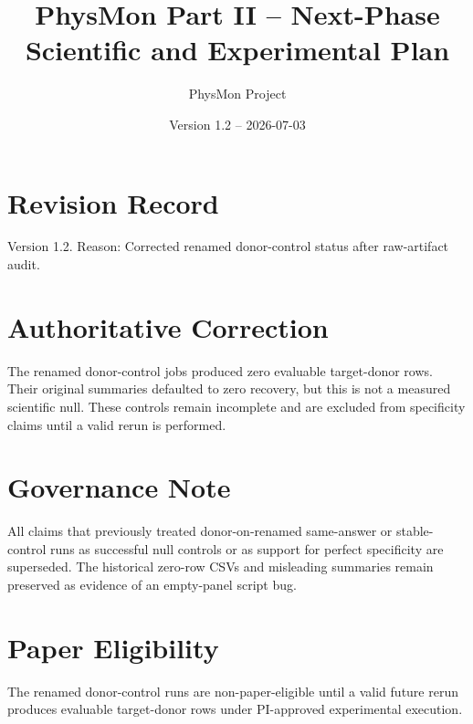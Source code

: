 \documentclass[11pt]{article}
\title{PhysMon Part II -- Next-Phase Scientific and Experimental Plan}
\author{PhysMon Project}
\date{Version 1.2 -- 2026-07-03}
\begin{document}
\maketitle

\section*{Revision Record}
Version 1.2. Reason: Corrected renamed donor-control status after raw-artifact audit.

\section*{Authoritative Correction}
The renamed donor-control jobs produced zero evaluable target-donor rows. Their original summaries defaulted to zero recovery, but this is not a measured scientific null. These controls remain incomplete and are excluded from specificity claims until a valid rerun is performed.

\section*{Governance Note}
All claims that previously treated donor-on-renamed same-answer or stable-control
runs as successful null controls or as support for perfect specificity are
superseded. The historical zero-row CSVs and
misleading summaries remain preserved as evidence of an empty-panel script bug.

\section*{Paper Eligibility}
The renamed donor-control runs are non-paper-eligible until a valid future rerun
produces evaluable target-donor rows under PI-approved experimental execution.
\end{document}
